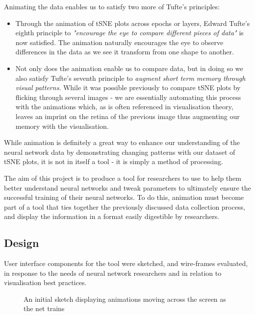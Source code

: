 \documentclass[a4paper,11pt,titlepage]{article}
\begin{document}
	Animating the data enables us to satisfy two more of Tufte's principles:
	\begin{itemize}
		\item Through the animation of tSNE plots across epochs or layers, Edward Tufte's eighth principle to \textit{"encourage the eye to compare different pieces of data"} is now satisfied. The animation naturally encourages the eye to observe differences in the data as we see it transform from one shape to another. 
		\item Not only does the animation enable us to compare data, but in doing so we also satisfy Tufte's seventh principle to \textit{augment short term memory through visual patterns}. While it was possible previously to compare tSNE plots by flicking through several images - we are essentially automating this process with the animations which, as is often referenced in visualisation theory, leaves an imprint on the retina of the previous image thus augmenting our memory with the visualisation. 
	\end{itemize}
	
	While animation is definitely a great way to enhance our understanding of the neural network data by demonstrating changing patterns with our dataset of tSNE plots, it is not in itself a tool - it is simply a method of processing. 
	\par 
	The aim of this project is to produce a tool for researchers to use to help them better understand neural networks and tweak parameters to ultimately ensure the successful training of their neural networks. To do this, animation must become part of a tool that ties together the previously discussed data collection process, and display the information in a format easily digestible by researchers.
	\par 
	
	\subsection{Design}
	User interface components for the tool were sketched, and wire-frames evaluated, in response to the needs of neural network researchers and in relation to visualisation best practices. 

	\begin{figure}[H]
    			\caption{An initial sketch displaying animations moving across the screen as the net trains}%
	\end{figure}		
	
\end{document}
